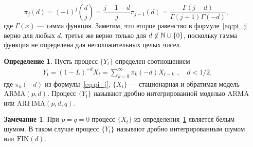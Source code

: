 \documentclass[specialist,
substylefile = spbu_report.rtx,
subf,href,colorlinks=true, 12pt]{disser}
\theoremstyle{definition}
\newtheorem{definition}{Определение}[section]
\newtheorem{remark}{Замечание}[section]
\newtheorem{assumption}{Предположение}[section]
\begin{document}
\begin{equation}\label{eq:pi_j}
	\pi_j(d)=(-1)^j\binom{d}{j}=\frac{j-1-d}{j}\pi_{j-1}(d)=\frac{\Gamma(j-d)}{\Gamma(j+1)\Gamma(-d)},
\end{equation}
где $\Gamma(x)$ --- гамма функция. Заметим, что второе равенство в формуле~\eqref{eq:pi_j} верно для любых $d$, третье же верно только для $d\not\in\mathbb{N}\cup\{0\}$, поскольку гамма функция не определена для неположительных целых чисел.
\begin{definition}\label{def:arfima}
	Пусть процесс $\{Y_t\}$ определен соотношением
	\[
		\begin{aligned}
			Y_t=(1-L)^{-d}X_t=\sum_{k=0}^\infty \pi_k(-d)X_{t-k}
		\end{aligned},\quad d<1/2,
	\]
	где $\pi_k(-d)$ из формулы~\eqref{eq:pi_j}, $\{X_t\}$ --- стационарная и обратимая модель $\mathrm{ARMA}(p, d)$. Процесс $\{Y_t\}$ называют дробно интегрированной моделью $\mathrm{ARMA}$ или $\mathrm{ARFIMA}(p, d, q)$.
\end{definition}
\begin{remark}
	При $p=q=0$ процесс $\{X_t\}$ из определения~\ref{def:arfima} является белым шумом. В таком случае процесс $\{Y_t\}$ называют дробно интегрированным шумом или $\mathrm{FIN}(d)$.
\end{remark}
\end{document}

